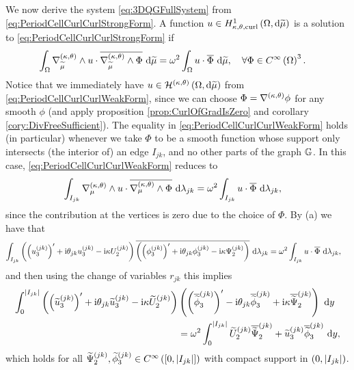 We now derive the system \eqref{eq:3DQGFullSystem} from \eqref{eq:PeriodCellCurlCurlStrongForm}.
A function $u\in H^1_{\kappa,\theta,\mathrm{curl}}\left( \Omega, \mathrm{d}\widetilde{\mu} \right)$ is a solution to \eqref{eq:PeriodCellCurlCurlStrongForm} if
\begin{align} \label{eq:PeriodCellCurlCurlWeakForm}
	\int_{\Omega} \nabla_{\widetilde{\mu}}^{\left( \kappa, \theta \right)}\wedge u\cdot\overline{\nabla_{\widetilde{\mu}}^{\left( \kappa, \theta \right)}\wedge\Phi}  \ \mathrm{d}\widetilde{\mu} &= \omega^2 \int_{\Omega} u\cdot\overline{\Phi}  \ \mathrm{d}\widetilde{\mu},
	\quad\forall \Phi\in C^{\infty}\left( \Omega \right)^3.
\end{align}
Notice that we immediately have $u\in\mathcal{H}^{\left( \kappa, \theta \right)}\left( \Omega, \mathrm{d}\widetilde{\mu} \right)$ from \eqref{eq:PeriodCellCurlCurlWeakForm}, since we can choose $\Phi = \nabla^{\left( \kappa, \theta \right)}\phi$ for any smooth $\phi$ (and apply proposition \ref{prop:CurlOfGradIsZero} and corollary \ref{cory:DivFreeSufficient}).
The equality in \eqref{eq:PeriodCellCurlCurlWeakForm} holds (in particular) whenever we take $\Phi$ to be a smooth function whose support only intersects (the interior of) an edge $I_{jk}$, and no other parts of the graph $\mathbb{G}$.
In this case, \eqref{eq:PeriodCellCurlCurlWeakForm} reduces to
\begin{align*}
	\int_{I_{jk}} \nabla_{\mu}^{\left( \kappa, \theta \right)}\wedge u\cdot\overline{\nabla_{\mu}^{\left( \kappa, \theta \right)}\wedge\Phi}  \ \mathrm{d}\lambda_{jk} &= \omega^2 \int_{I_{jk}} u\cdot\overline{\Phi}  \ \mathrm{d}\lambda_{jk},
\end{align*}
since the contribution at the vertices is zero due to the choice of $\Phi$.
By (a) we have that
\begin{align*}
	\int_{I_{jk}} \left(  \left( u_3^{(jk)} \right)' + \mathrm{i}\theta_{jk} u_3^{(jk)} - \mathrm{i}\kappa U_2^{(jk)}  \right)\overline{\left(  \left( \phi_3^{(jk)} \right)' + \mathrm{i}\theta_{jk} \phi_3^{(jk)} - \mathrm{i}\kappa \Psi_2^{(jk)}  \right)}  \ \mathrm{d}\lambda_{jk}
	&= \omega^2 \int_{I_{jk}} u\cdot\overline{\Phi}  \ \mathrm{d}\lambda_{jk},
\end{align*}
and then using the change of variables $r_{jk}$ this implies
\begin{align*} 
	\int_0^{\left\lvert I_{jk} \right\rvert} \left(  \left( \widetilde{u}_3^{(jk)} \right)' + \mathrm{i}\theta_{jk} \widetilde{u}_3^{(jk)} - \mathrm{i}\kappa \widetilde{U}_2^{(jk)}  \right) 
	& \left(  \left( \overline{\widetilde{\phi}}_3^{(jk)} \right)' - \mathrm{i}\theta_{jk} \overline{\widetilde{\phi}}_3^{(jk)} + \mathrm{i}\kappa \overline{\widetilde{\Psi}}_2^{(jk)}  \right) \ \mathrm{d} y 
	\\
	&= \omega^2 \int_0^{\left\lvert I_{jk} \right\rvert} \widetilde{U}_2^{(jk)}\overline{\widetilde{\Psi}}_2^{(jk)} + \widetilde{u}_3^{(jk)}\overline{\widetilde{\phi}}_3^{(jk)} \ \mathrm{d} y,
\end{align*}
which holds for all $\widetilde{\Psi}_2^{(jk)}, \widetilde{\phi}_3^{(jk)}\in C^{\infty}\left( \left[ 0,\left\lvert I_{jk} \right\rvert \right] \right)$ with compact support in $\left( 0,\left\lvert I_{jk} \right\rvert \right)$.
